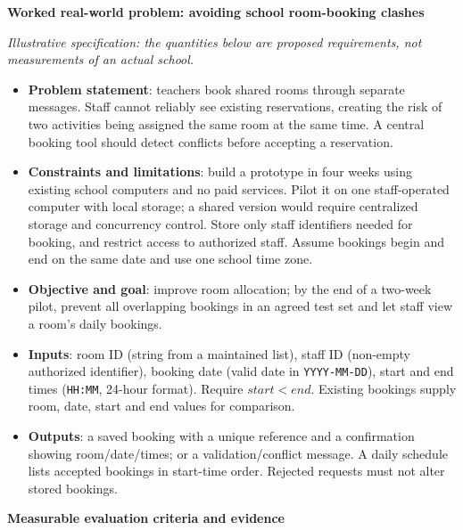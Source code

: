 \documentclass[a4paper,12pt]{article}
\begin{document}
\textbf{Worked real-world problem: avoiding school room-booking clashes}

\textit{Illustrative specification: the quantities below are proposed requirements, not measurements of an actual school.}
\begin{itemize}
    \item \textbf{Problem statement}: teachers book shared rooms through separate messages. Staff cannot reliably see existing reservations, creating the risk of two activities being assigned the same room at the same time. A central booking tool should detect conflicts before accepting a reservation.
    \item \textbf{Constraints and limitations}: build a prototype in four weeks using existing school computers and no paid services. Pilot it on one staff-operated computer with local storage; a shared version would require centralized storage and concurrency control. Store only staff identifiers needed for booking, and restrict access to authorized staff. Assume bookings begin and end on the same date and use one school time zone.
    \item \textbf{Objective and goal}: improve room allocation; by the end of a two-week pilot, prevent all overlapping bookings in an agreed test set and let staff view a room's daily bookings.
    \item \textbf{Inputs}: room ID (string from a maintained list), staff ID (non-empty authorized identifier), booking date (valid date in \texttt{YYYY-MM-DD}), start and end times (\texttt{HH:MM}, 24-hour format). Require $start < end$. Existing bookings supply room, date, start and end values for comparison.
    \item \textbf{Outputs}: a saved booking with a unique reference and a confirmation showing room/date/times; or a validation/conflict message. A daily schedule lists accepted bookings in start-time order. Rejected requests must not alter stored bookings.
\end{itemize}
\textbf{Measurable evaluation criteria and evidence}
\end{document}
